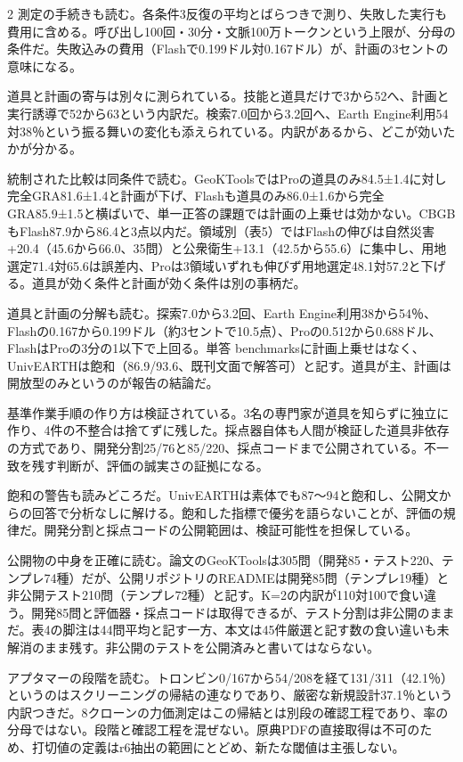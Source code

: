 \documentclass[lualatex,a4paper,10pt]{jlreq}
\begin{document}
\begin{multicols}{2}
測定の手続きも読む。各条件3反復の平均とばらつきで測り、失敗した実行も費用に含める。呼び出し100回・30分・文脈100万トークンという上限が、分母の条件だ。失敗込みの費用（Flashで0.199ドル対0.167ドル）が、計画の3セントの意味になる。
\cite{B47,B84,B48}


道具と計画の寄与は別々に測られている。技能と道具だけで3から52へ、計画と実行誘導で52から63という内訳だ。検索7.0回から3.2回へ、Earth Engine利用54対38％という振る舞いの変化も添えられている。内訳があるから、どこが効いたかが分かる。
\cite{B47,B84,B48}


統制された比較は同条件で読む。GeoKToolsではProの道具のみ84.5±1.4に対し完全GRA81.6±1.4と計画が下げ、Flashも道具のみ86.0±1.6から完全GRA85.9±1.5と横ばいで、単一正答の課題では計画の上乗せは効かない。CBGBもFlash87.9から86.4と3点以内だ。領域別（表5）ではFlashの伸びは自然災害+20.4（45.6から66.0、35問）と公衆衛生+13.1（42.5から55.6）に集中し、用地選定71.4対65.6は誤差内、Proは3領域いずれも伸びず用地選定48.1対57.2と下げる。道具が効く条件と計画が効く条件は別の事柄だ。
\cite{B47,B84,B48}


道具と計画の分解も読む。探索7.0から3.2回、Earth Engine利用38から54％、Flashの0.167から0.199ドル（約3セントで10.5点）、Proの0.512から0.688ドル、FlashはProの3分の1以下で上回る。単答 benchmarksに計画上乗せはなく、UnivEARTHは飽和（86.9/93.6、既刊文面で解答可）と記す。道具が主、計画は開放型のみというのが報告の結論だ。
\cite{B47,B84,B48}


基準作業手順の作り方は検証されている。3名の専門家が道具を知らずに独立に作り、4件の不整合は捨てずに残した。採点器自体も人間が検証した道具非依存の方式であり、開発分割25/76と85/220、採点コードまで公開されている。不一致を残す判断が、評価の誠実さの証拠になる。
\cite{B47,B84,B48}


飽和の警告も読みどころだ。UnivEARTHは素体でも87〜94と飽和し、公開文からの回答で分析なしに解ける。飽和した指標で優劣を語らないことが、評価の規律だ。開発分割と採点コードの公開範囲は、検証可能性を担保している。
\cite{B47,B84,B48}


公開物の中身を正確に読む。論文のGeoKToolsは305問（開発85・テスト220、テンプレ74種）だが、公開リポジトリのREADMEは開発85問（テンプレ19種）と非公開テスト210問（テンプレ72種）と記す。K=2の内訳が110対100で食い違う。開発85問と評価器・採点コードは取得できるが、テスト分割は非公開のままだ。表4の脚注は44問平均と記す一方、本文は45件厳選と記す数の食い違いも未解消のまま残す。非公開のテストを公開済みと書いてはならない。
\cite{B47,B84,B48,B61}


アプタマーの段階を読む。トロンビン0/167から54/208を経て131/311（42.1％）というのはスクリーニングの帰結の連なりであり、厳密な新規設計37.1％という内訳つきだ。8クローンの力価測定はこの帰結とは別段の確認工程であり、率の分母ではない。段階と確認工程を混ぜない。原典PDFの直接取得は不可のため、打切値の定義はr6抽出の範囲にとどめ、新たな閾値は主張しない。
\cite{B46,B83,B44,B43,B45}



\end{multicols}
\end{document}
